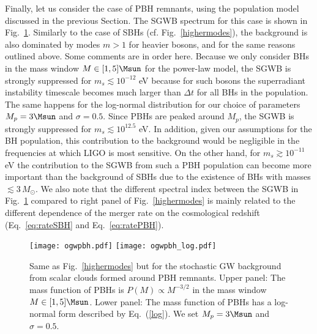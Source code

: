 \documentclass[
reprint,           %
superscriptaddress,%
amsmath,           %
amssymb,           %
aps,               %
prd,               %
notitlepage,       %
floatfix,          %
nofootinbib %
]{revtex4-1}
\begin{document}
Finally, let us consider the case of PBH remnants, using the population model discussed in the previous Section. The SGWB spectrum for this case is shown in Fig.~\ref{ogwpbh}. Similarly to the case of SBHs (cf. Fig.~\ref{highermodes}), the background is also dominated by modes $m>1$ for heavier bosons, and for the same reasons outlined above. Some comments are in order here.  Because we only consider BHs in the mass window $M\in [1,5]\Msun$ for the power-law model, the SGWB is strongly suppressed for $m_s\lesssim 10^{-12} $ eV because for such bosons the superradiant instability timescale becomes much larger than $\Delta t$ for all BHs in the population. The same happens for the log-normal distribution for our choice of parameters $M_p=3\Msun$ and $\sigma=0.5$. Since PBHs are peaked around $M_p$, the SGWB is strongly suppressed for $m_s\lesssim10^{12.5}$ eV. In addition, given our assumptions for the BH population, this contribution to the background would be negligible in the frequencies at which LIGO is most sensitive. On the other hand, for $m_s\gtrsim 10^{-11}$ eV the contribution to the SGWB from such a PBH population can become more important than the background of SBHs due to the existence of BHs with masses $\lesssim 3\, M_{\odot}$. We also note that the different spectral index between the SGWB in Fig.~\ref{ogwpbh} compared to right panel of Fig.~\ref{highermodes} is mainly related to the different dependence of the merger rate on the cosmological redshift
(Eq.~\eqref{eq:rateSBH} and Eq.~\eqref{eq:ratePBH}).
%

\begin{figure*}[htbp!]
	\centering
	\texttt{[image: ogwpbh.pdf]}
	\texttt{[image: ogwpbh\_log.pdf]}
	\caption{\label{ogwpbh} Same as Fig.~\ref{highermodes} but for the stochastic GW background from scalar clouds formed around PBH remnants. Upper panel: The mass function of PBHs is $P(M)\propto M^{-3/2}$ in the mass window $M\in [1,5]\Msun$.
	Lower panel: The mass function of PBHs has a log-normal form described by Eq.~(\ref{log}). We set $M_p=3\Msun$ and $\sigma=0.5$.
}
\end{figure*}
\end{document}

